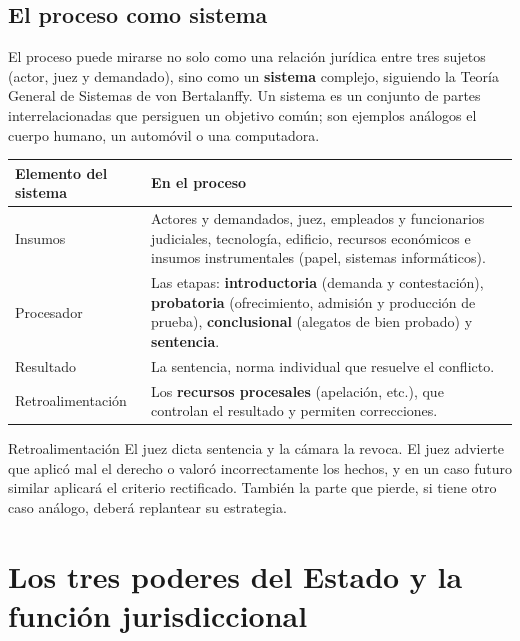 \documentclass[12pt,oneside]{book}
\renewcommand{\arraystretch}{1.15}
\begin{document}
\subsection{El proceso como sistema}

El proceso puede mirarse no solo como una relación jurídica entre tres sujetos (actor, juez y demandado), sino como un \textbf{sistema} complejo, siguiendo la Teoría General de Sistemas de von Bertalanffy. Un sistema es un conjunto de partes interrelacionadas que persiguen un objetivo común; son ejemplos análogos el cuerpo humano, un automóvil o una computadora.

\begin{table}[H]
\centering
\renewcommand{\arraystretch}{1.25}
\begin{tabularx}{\textwidth}{>{\RaggedRight\arraybackslash}p{}>{\RaggedRight\arraybackslash}X}
\toprule
\textbf{Elemento del sistema} & \textbf{En el proceso} \\
\midrule
Insumos & Actores y demandados, juez, empleados y funcionarios judiciales, tecnología, edificio, recursos económicos e insumos instrumentales (papel, sistemas informáticos). \\
\addlinespace
Procesador & Las etapas: \textbf{introductoria} (demanda y contestación), \textbf{probatoria} (ofrecimiento, admisión y producción de prueba), \textbf{conclusional} (alegatos de bien probado) y \textbf{sentencia}. \\
\addlinespace
Resultado & La sentencia, norma individual que resuelve el conflicto. \\
\addlinespace
Retroalimentación & Los \textbf{recursos procesales} (apelación, etc.), que controlan el resultado y permiten correcciones. \\
\bottomrule
\end{tabularx}
\end{table}

\begin{example}{Retroalimentación}
El juez dicta sentencia y la cámara la revoca. El juez advierte que aplicó mal el derecho o valoró incorrectamente los hechos, y en un caso futuro similar aplicará el criterio rectificado. También la parte que pierde, si tiene otro caso análogo, deberá replantear su estrategia.
\end{example}

\section{Los tres poderes del Estado y la función jurisdiccional}
\end{document}

